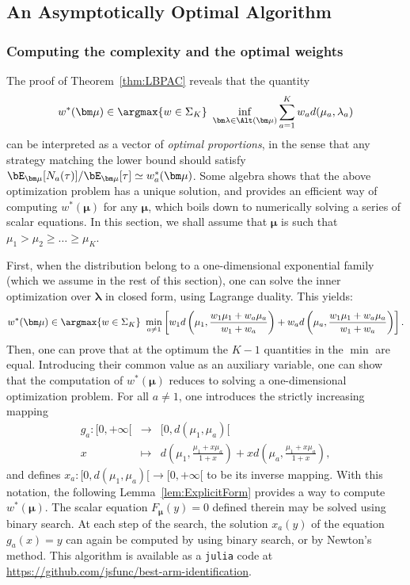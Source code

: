\documentclass[proc]{edpsmath}
\begin{document}
	
	
	
	\subsection{An Asymptotically Optimal Algorithm}\label{sec:TaS}
	
	\subsubsection{Computing the complexity and the optimal weights}
	The proof of Theorem~\ref{thm:LBPAC} reveals that the quantity 
	\[w^*(\bm \mu) \in \argmax{w \in \Sigma_K} \ \inf_{\bm \lambda \in \Alt(\bm \mu)} \sum_{a=1}^K w_a d (\mu_a,\lambda_a) \]
	can be interpreted as a vector of \emph{optimal proportions}, in the sense that any strategy matching the lower bound should satisfy $\bE_{\bm \mu}[N_a(\tau)]/\bE_{\bm\mu}[\tau] \simeq w^*_a(\bm \mu)$. Some algebra shows that the above optimization problem has a unique solution, and provides an efficient way of computing $w^*(\bm\mu)$ for any $\bm\mu$, which boils down to numerically solving a series of scalar equations. In this section, we shall assume that $\bm \mu$ is such that $\mu_1 > \mu_2 \geq \dots \geq \mu_K$.
	
	First, when the distribution belong to a one-dimensional exponential family (which we assume in the rest of this section), one can solve the inner optimization over $\bm\lambda$ in closed form, using Lagrange duality. This yields:
	\[w^*(\bm \mu) \in \argmax{w \in \Sigma_K} \ \min_{a\neq 1} \left[w_1 d \left(\mu_1,\frac{w_1\mu_1 + w_a\mu_a}{w_1+w_a}\right) + w_a d \left(\mu_a,\frac{w_1\mu_1 + w_a\mu_a}{w_1+w_a}\right)\right].\]
	Then, one can prove that at the optimum the $K-1$ quantities in the $\min$ are equal. Introducing their common value as an auxiliary variable, one can show that the computation of $w^*(\bm\mu)$ reduces to solving a one-dimensional optimization problem. For all $a\neq 1$, one introduces the strictly increasing mapping 
	\begin{eqnarray*}
		g_a : [0,+\infty[ & \longrightarrow & [0,d(\mu_1,\mu_a)[ \\
		x & \mapsto & d\left(\mu_1,\frac{\mu_1 + x \mu_a}{1+x}\right)+ xd\left(\mu_a,\frac{\mu_1 + x \mu_a}{1+x}\right),
	\end{eqnarray*}
	and defines $x_a : [0,d(\mu_1,\mu_a)[ \rightarrow [0,+\infty[$ to be its inverse mapping. With this notation, the following Lemma~\ref{lem:ExplicitForm} provides a way to compute $w^*(\bm\mu)$. The scalar equation $F_{\bm \mu}(y)=0$ defined therein may be solved using binary search. At each step of the search, the solution $x_a(y)$ of the equation $g_a(x)=y$ can again be computed by using binary search, or by Newton's method. This algorithm is available as a \texttt{julia} code at \url{https://github.com/jsfunc/best-arm-identification}.
	
\end{document}
